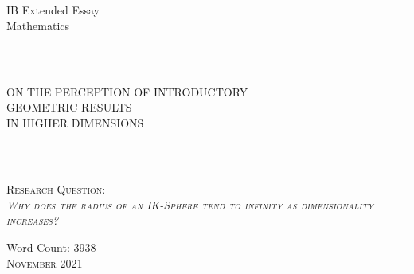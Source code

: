 \begin{titlepage}

    \centering
    \vfill
    
    \large{IB Extended Essay}\\
    \large{Mathematics}\\
    
    \rule{\textwidth}{1.6pt}\vspace*{-\baselineskip}\vspace*{3.2pt}
    \rule{\textwidth}{0.4pt}\\[0.2\baselineskip]
    
    {\LARGE ON THE PERCEPTION OF INTRODUCTORY\\[0.3\baselineskip] GEOMETRIC RESULTS\\[0.5\baselineskip] IN HIGHER DIMENSIONS}\\[0.2\baselineskip]
    
    
    
    \rule{\textwidth}{0.4pt}\vspace*{-\baselineskip}\vspace*{4pt}
    \rule{\textwidth}{1.6pt}\\[\baselineskip]
    \scshape
    \vfill
    Research Question:\\
    \textit{Why  does  the  radius  of  an  IK-Sphere  tend  to  infinity  as  dimensionality increases?}
    \par
    \vfill
    
    \small{Word Count: 3938} \\
    \vspace*{2\baselineskip}
    {\scshape November 2021} \\
  \end{titlepage}